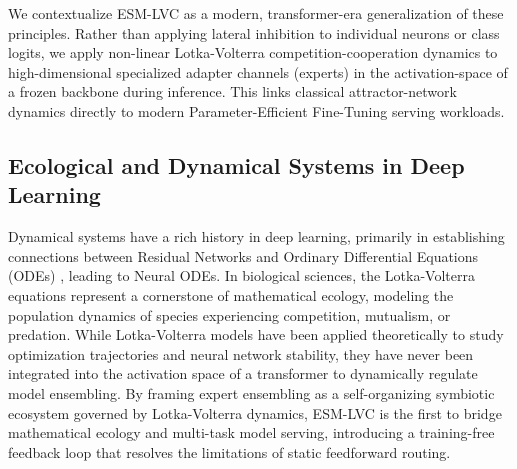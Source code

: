 We contextualize ESM-LVC as a modern, transformer-era generalization of these principles. Rather than applying lateral inhibition to individual neurons or class logits, we apply non-linear Lotka-Volterra competition-cooperation dynamics to high-dimensional specialized adapter channels (experts) in the activation-space of a frozen backbone during inference. This links classical attractor-network dynamics directly to modern Parameter-Efficient Fine-Tuning serving workloads.

\subsection{Ecological and Dynamical Systems in Deep Learning}
Dynamical systems have a rich history in deep learning, primarily in establishing connections between Residual Networks and Ordinary Differential Equations (ODEs) \cite{he2016deep}, leading to Neural ODEs. 
In biological sciences, the Lotka-Volterra equations represent a cornerstone of mathematical ecology, modeling the population dynamics of species experiencing competition, mutualism, or predation. 
While Lotka-Volterra models have been applied theoretically to study optimization trajectories and neural network stability, they have never been integrated into the activation space of a transformer to dynamically regulate model ensembling. 
By framing expert ensembling as a self-organizing symbiotic ecosystem governed by Lotka-Volterra dynamics, ESM-LVC is the first to bridge mathematical ecology and multi-task model serving, introducing a training-free feedback loop that resolves the limitations of static feedforward routing.

